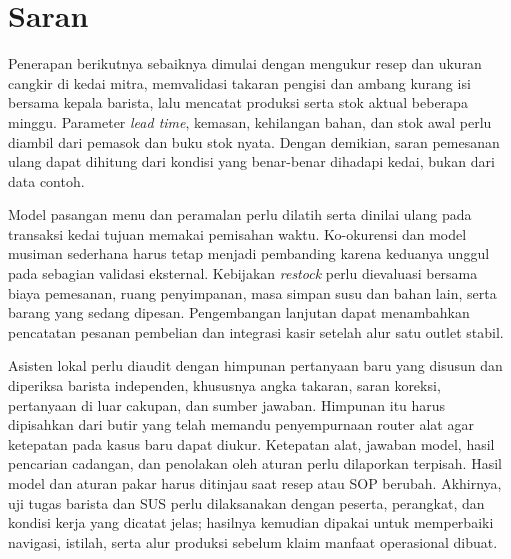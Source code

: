 \section{Saran}
\label{sec:saran}

Penerapan berikutnya sebaiknya dimulai dengan mengukur resep dan ukuran cangkir di kedai mitra, memvalidasi takaran pengisi dan ambang kurang isi bersama kepala barista, lalu mencatat produksi serta stok aktual beberapa minggu. Parameter \textit{lead time}, kemasan, kehilangan bahan, dan stok awal perlu diambil dari pemasok dan buku stok nyata. Dengan demikian, saran pemesanan ulang dapat dihitung dari kondisi yang benar-benar dihadapi kedai, bukan dari data contoh.

Model pasangan menu dan peramalan perlu dilatih serta dinilai ulang pada transaksi kedai tujuan memakai pemisahan waktu. Ko-okurensi dan model musiman sederhana harus tetap menjadi pembanding karena keduanya unggul pada sebagian validasi eksternal. Kebijakan \textit{restock} perlu dievaluasi bersama biaya pemesanan, ruang penyimpanan, masa simpan susu dan bahan lain, serta barang yang sedang dipesan. Pengembangan lanjutan dapat menambahkan pencatatan pesanan pembelian dan integrasi kasir setelah alur satu outlet stabil.

Asisten lokal perlu diaudit dengan himpunan pertanyaan baru yang disusun dan diperiksa barista independen, khususnya angka takaran, saran koreksi, pertanyaan di luar cakupan, dan sumber jawaban. Himpunan itu harus dipisahkan dari butir yang telah memandu penyempurnaan router alat agar ketepatan pada kasus baru dapat diukur. Ketepatan alat, jawaban model, hasil pencarian cadangan, dan penolakan oleh aturan perlu dilaporkan terpisah. Hasil model dan aturan pakar harus ditinjau saat resep atau SOP berubah. Akhirnya, uji tugas barista dan SUS perlu dilaksanakan dengan peserta, perangkat, dan kondisi kerja yang dicatat jelas; hasilnya kemudian dipakai untuk memperbaiki navigasi, istilah, serta alur produksi sebelum klaim manfaat operasional dibuat.
